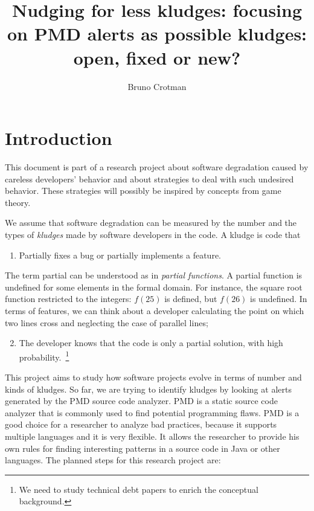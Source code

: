\documentclass[
]{article}
\title{Nudging for less kludges: focusing on PMD alerts as possible
kludges: open, fixed or new?}
\author{Bruno Crotman}
\date{}
\providecommand{\tightlist}{%
  \setlength{\itemsep}{0pt}\setlength{\parskip}{0pt}}
\begin{document}
\maketitle

{
\setcounter{tocdepth}{2}
\tableofcontents
}
\small

\normalsize

\section{Introduction}\label{intro}

This document is part of a research project about software degradation
caused by careless developers' behavior and about strategies to deal
with such undesired behavior. These strategies will possibly be inspired
by concepts from game theory.

We assume that software degradation can be measured by the number and
the types of \textit{kludges} made by software developers in the code. A
kludge is code that

\begin{enumerate}
\def\labelenumi{\arabic{enumi}.}
\tightlist
\item
  Partially fixes a bug or partially implements a feature.
\end{enumerate}

\setlength{\parindent}{1.0cm}
\hangindent=1.0cm

The term partial can be understood as in \textit{partial functions}. A
partial function is undefined for some elements in the formal domain.
For instance, the square root function restricted to the integers:
\(f(25)\) is defined, but \(f(26)\) is undefined. In terms of features,
we can think about a developer calculating the point on which two lines
cross and neglecting the case of parallel lines;

\begin{enumerate}
\setcounter{enumi}{1}
\tightlist
\item
  The developer knows that the code is only a partial solution, with
  high probability.~\footnote{We need to study technical debt papers
  to enrich the conceptual background.}
\end{enumerate}

This project aims to study how software projects evolve in terms of
number and kinds of kludges. So far, we are trying to identify kludges
by looking at alerts generated by the PMD source code analyzer. PMD is a
static source code analyzer that is commonly used to find potential
programming flaws. PMD is a good choice for a researcher to analyze bad
practices, because it supports multiple languages and it is very
flexible. It allows the researcher to provide his own rules for finding
interesting patterns in a source code in Java or other languages. The
planned steps for this research project are:
\end{document}
